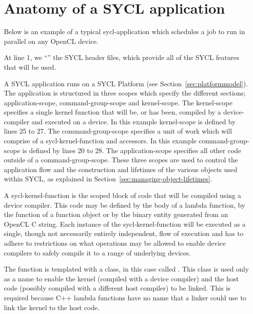 \newpage
\section{Anatomy of a SYCL application}

Below is an example of a typical \gls{sycl-application} which schedules a job to run
in parallel on any OpenCL device.

\lstset{
         numbers=left,
         stepnumber=1,
         numberfirstline=false
 }

At line 1, we ``'' the SYCL header files, which
provide all of the SYCL features that will be used.

A SYCL application runs on a SYCL Platform (see Section~\ref{sec:platformmodel}).
The application is structured in three scopes which specify the different sections;
\gls{application-scope}, \gls{command-group-scope} and \gls{kernel-scope}.
The \gls{kernel-scope} specifies a single kernel function that will
be, or has been, compiled by a \gls{device-compiler} and executed on a
\gls{device}. In this example \gls{kernel-scope} is defined by lines
25 to 27.  The \gls{command-group-scope} specifies a unit of work which will
comprise of a \gls{sycl-kernel-function} and \glspl{accessor}.  In this
example \gls{command-group-scope} is defined by lines 20 to 28.  The
\gls{application-scope} specifies all other code outside of a
\gls{command-group-scope}.  
These three scopes are used to control the
application flow and the construction and lifetimes of the various objects used
within SYCL, as explained in Section~\ref{sec:managing-object-lifetimes}.

A \gls{sycl-kernel-function} is the scoped block of code that will be
compiled using a device compiler.  This code may be defined by the
body of a lambda function, by the  function of
a function object or by the binary  entity
generated from an OpenCL C string.  Each instance of the
\gls{sycl-kernel-function} will be executed as a single, though not
necessarily entirely independent, flow of execution and has to adhere
to restrictions on what operations may be allowed to enable device
compilers to safely compile it to a range of underlying devices.

The  function is templated with a class, in this case
called . This class is used only as a name to
enable the kernel (compiled with a device compiler) and the host code (possibly
compiled with a different host compiler) to be linked. This is required
because C++ lambda functions have no name that a linker could use to link the
kernel to the host code.

